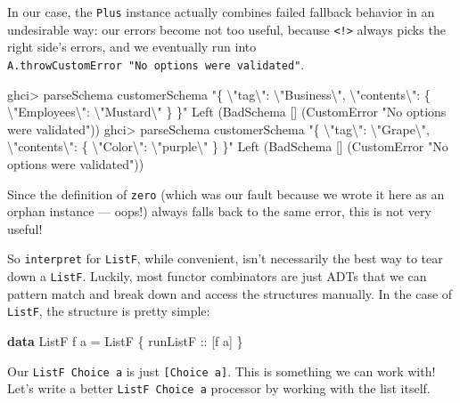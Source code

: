 \documentclass[]{article}
\newenvironment{Shaded}{}{}
\newcommand{\DataTypeTok}[1]{\textcolor[rgb]{0.56,0.13,0.00}{#1}}
\newcommand{\KeywordTok}[1]{\textcolor[rgb]{0.00,0.44,0.13}{\textbf{#1}}}
\newcommand{\NormalTok}[1]{#1}
\newcommand{\OperatorTok}[1]{\textcolor[rgb]{0.40,0.40,0.40}{#1}}
\newcommand{\OtherTok}[1]{\textcolor[rgb]{0.00,0.44,0.13}{#1}}
\newcommand{\StringTok}[1]{\textcolor[rgb]{0.25,0.44,0.63}{#1}}
\begin{document}
In our case, the \texttt{Plus} instance actually combines failed fallback
behavior in an undesirable way: our errors become not too useful, because
\texttt{\textless{}!\textgreater{}} always picks the right side's errors, and we
eventually run into \texttt{A.throwCustomError\ "No\ options\ were\ validated"}.

\begin{Shaded}
\begin{Highlighting}[]
\NormalTok{ghci}\OperatorTok{>}\NormalTok{ parseSchema customerSchema  }\StringTok{"\{ \textbackslash{}"tag\textbackslash{}": \textbackslash{}"Business\textbackslash{}", \textbackslash{}"contents\textbackslash{}": \{ \textbackslash{}"Employees\textbackslash{}": \textbackslash{}"Mustard\textbackslash{}" \} \}"}
\DataTypeTok{Left}\NormalTok{ (}\DataTypeTok{BadSchema}\NormalTok{ [] (}\DataTypeTok{CustomError} \StringTok{"No options were validated"}\NormalTok{))}
\NormalTok{ghci}\OperatorTok{>}\NormalTok{ parseSchema customerSchema  }\StringTok{"\{ \textbackslash{}"tag\textbackslash{}": \textbackslash{}"Grape\textbackslash{}", \textbackslash{}"contents\textbackslash{}": \{ \textbackslash{}"Color\textbackslash{}": \textbackslash{}"purple\textbackslash{}" \} \}"}
\DataTypeTok{Left}\NormalTok{ (}\DataTypeTok{BadSchema}\NormalTok{ [] (}\DataTypeTok{CustomError} \StringTok{"No options were validated"}\NormalTok{))}
\end{Highlighting}
\end{Shaded}

Since the definition of \texttt{zero} (which was our fault because we wrote it
here as an orphan instance --- oops!) always falls back to the same error, this
is not very useful!

So \texttt{interpret} for \texttt{ListF}, while convenient, isn't necessarily
the best way to tear down a \texttt{ListF}. Luckily, most functor combinators
are just ADTs that we can pattern match and break down and access the structures
manually. In the case of \texttt{ListF}, the structure is pretty simple:

\begin{Shaded}
\begin{Highlighting}[]
\KeywordTok{data} \DataTypeTok{ListF}\NormalTok{ f a }\OtherTok{=} \DataTypeTok{ListF}\NormalTok{ \{}\OtherTok{ runListF ::}\NormalTok{ [f a] \}}
\end{Highlighting}
\end{Shaded}

Our \texttt{ListF\ Choice\ a} is just \texttt{{[}Choice\ a{]}}. This is
something we can work with! Let's write a better \texttt{ListF\ Choice\ a}
processor by working with the list itself.
\end{document}
